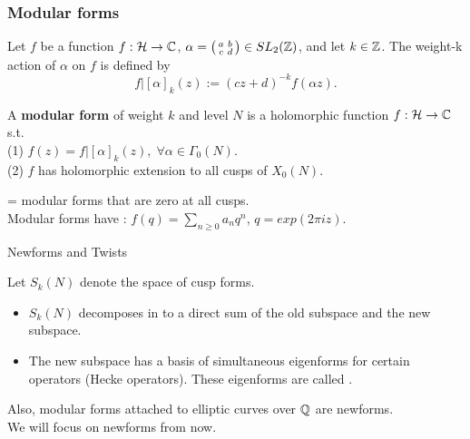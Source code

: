 \documentclass[handout]{beamer}
\begin{document}
\begin{frame}
\frametitle{Modular forms}
Let $f$ be a function $f: \mathcal{H} \to \mathbb{C}$,  $\alpha  = \left( \begin{smallmatrix}a&b\\c&d\end{smallmatrix}\right) \in SL_2(\mathbb{Z})$, and let $k \in \mathbb{Z}$. The weight-k action of $\alpha$ on $f$ is
defined by
\[
	f|[\alpha]_k(z) := (cz+d)^{-k}f(\alpha z).
\]

\pause

\begin{Def}
A \textbf{modular form} of weight $k$ and level $N$ is a holomorphic function $f: \mathcal{H} \to \mathbb{C}$ s.t. \\
(1) $f(z)  = f|[\alpha]_k(z), \; \forall \alpha \in \Gamma_0(N)$. \\
(2) $f$ has holomorphic extension to all cusps of $X_0(N)$. \\
\end{Def}

\pause

 = modular forms that are zero at all cusps. \\
Modular forms have : $f(q) = \sum_{n \geq 0} a_n q^n$, $q = exp(2\pi i z)$. \\

\end{frame}


\begin{frame}{Newforms and Twists}

Let $S_k(N)$ denote the space of cusp forms. 

\begin{itemize}
\item $S_k(N)$ decomposes in to a direct sum of the old subspace and the new subspace. 
\item The new subspace has a basis of simultaneous eigenforms for certain operators (Hecke operators). 
These eigenforms are called .
\end{itemize}

Also,  modular forms attached to elliptic curves over $\mathbb{Q}$ are newforms.  \\ 
We will focus on newforms from now. 
\end{frame}
\end{document}
